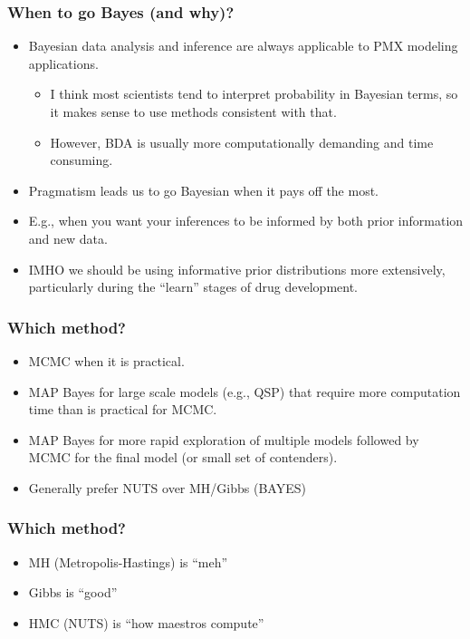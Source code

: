 \documentclass[handout]{beamer}
\begin{document}
\begin{frame}
  \frametitle{When to go Bayes (and why)?}
  
  \begin{itemize}
  \item Bayesian data analysis and inference are always applicable to
    PMX modeling applications. 
    \begin{itemize}
    \item I think most scientists tend to
    interpret probability in Bayesian terms, so it makes sense to use
    methods consistent with that. 
\item However, BDA is usually more
    computationally demanding and time consuming.
    \end{itemize}
  \item Pragmatism leads us to go Bayesian when it pays off the most.
  \item E.g., when you want your inferences to be informed by both prior
    information and new data.
  \item IMHO we should be using informative prior distributions more
    extensively, particularly during the “learn” stages of drug
    development.
  \end{itemize}

\end{frame}

\begin{frame}
  \frametitle{Which method?}
  
  \begin{itemize}
  \item MCMC when it is practical.
  \item MAP Bayes for large scale models (e.g., QSP) that require more
    computation time than is practical for MCMC.
  \item MAP Bayes for more rapid exploration of multiple models
    followed by MCMC for the final model (or small set of contenders).
  \item Generally prefer NUTS over MH/Gibbs (BAYES)
  \end{itemize}

\end{frame}

\begin{frame}
  \frametitle{Which method?}
  
  \begin{itemize}
  \item MH (Metropolis-Hastings) is ``meh''
  \item Gibbs is ``good''
  \item HMC (NUTS) is ``how maestros compute''
  \end{itemize}

\end{frame}
\end{document}

